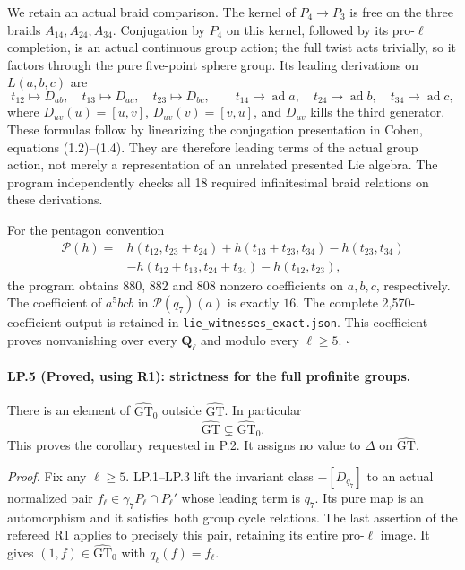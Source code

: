 We retain an actual braid comparison. The kernel of
$P_4\to P_3$ is free on the three braids $A_{14},A_{24},A_{34}$.
Conjugation by $P_4$ on this kernel, followed by its pro-$\ell$
completion, is an actual continuous group action; the full twist
acts trivially, so it factors through the pure five-point sphere
group. Its leading derivations on $L(a,b,c)$ are
\[
 t_{12}\mapsto D_{ab},\quad t_{13}\mapsto D_{ac},\quad
 t_{23}\mapsto D_{bc},\qquad
 t_{14}\mapsto\operatorname{ad}a,\quad
 t_{24}\mapsto\operatorname{ad}b,\quad
 t_{34}\mapsto\operatorname{ad}c,
\]
where $D_{uv}(u)=[u,v]$, $D_{uv}(v)=[v,u]$, and $D_{uv}$
kills the third generator. These formulas follow by linearizing
the conjugation presentation in Cohen, equations (1.2)--(1.4).
They are therefore leading terms of the actual group action,
not merely a representation of an unrelated presented Lie algebra.
The program independently checks all 18 required infinitesimal
braid relations on these derivations.

For the pentagon convention
\[
\begin{split}
\mathcal P(h)={}&h(t_{12},t_{23}+t_{24})
 +h(t_{13}+t_{23},t_{34})-h(t_{23},t_{34})\\
 &-h(t_{12}+t_{13},t_{24}+t_{34})-h(t_{12},t_{23}),
\end{split}
\]
the program obtains 880, 882 and 808 nonzero coefficients on
$a,b,c$, respectively. The coefficient of $a^5bcb$ in
$\mathcal P(q_7)(a)$ is exactly $16$. The complete 2,570-coefficient
output is retained in \texttt{lie\_witnesses\_exact.json}.
This coefficient proves nonvanishing over every $\mathbf Q_\ell$
and modulo every $\ell\geq5$. \hfill$\square$

\paragraph{LP.5 (Proved, using R1): strictness for the full profinite groups.}
There is an element of $\widehat{\mathrm{GT}}_0$ outside
$\widehat{\mathrm{GT}}$. In particular
\[
             \widehat{\mathrm{GT}}
                    \subsetneq\widehat{\mathrm{GT}}_0.
\]
This proves the corollary requested in P.2. It assigns no value to
$\Delta$ on $\widehat{\mathrm{GT}}$.

\emph{Proof.}
Fix any $\ell\geq5$. LP.1--LP.3 lift the invariant class
$-[D_{q_7}]$ to an actual normalized pair
$f_\ell\in\gamma_7P_\ell\cap P_\ell'$ whose leading term is $q_7$.
Its pure map is an automorphism and it satisfies both group cycle
relations. The last assertion of the refereed R1 applies to
precisely this pair, retaining its entire pro-$\ell$ image. It
gives $(1,f)\in\widehat{\mathrm{GT}}_0$ with
$q_\ell(f)=f_\ell$.

